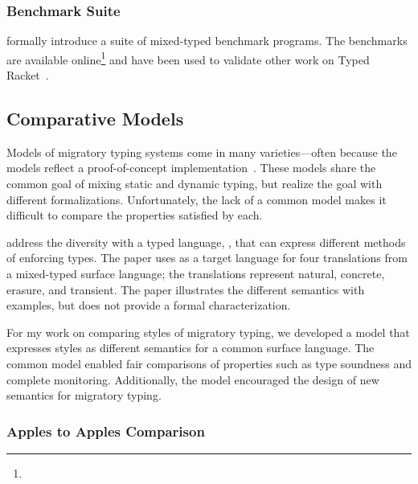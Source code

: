 \subsubsection{Benchmark Suite}

\citet{gtnffvf-jfp-2019} formally introduce a suite of mixed-typed benchmark
 programs.
The benchmarks are available online\footnote{}
 and have been used to validate other work on Typed Racket~\cite{gf-icfp-2018,gt-alive}.


\subsection{Comparative Models}

Models of migratory typing systems come in many varieties---often because
 the models reflect a proof-of-concept implementation~\cite{bat-ecoop-2014,wnlov-popl-2010,mt-oopsla-2017,vss-popl-2017,tf-popl-2008}.
These models share the common goal of mixing static and dynamic typing,
 but realize the goal with different formalizations.
Unfortunately, the lack of a common model makes it difficult to compare the
 properties satisfied by each.

\citet{clzv-ecoop-2018} address the diversity with a typed language, \kafka{},
 that can express different methods of enforcing types.
The paper uses \kafka{} as a target language for four translations from
 a mixed-typed surface language; the translations represent natural,
 concrete, erasure, and transient.
The paper illustrates the different semantics with examples, but does not
 provide a formal characterization.

For my work on comparing styles of migratory typing, we developed
 a model that expresses styles as different semantics
 for a common surface language.
The common model enabled fair comparisons of properties
 such as type soundness and complete monitoring.
Additionally, the model encouraged the design of new semantics for migratory
 typing.

\subsubsection{Apples to Apples Comparison}


